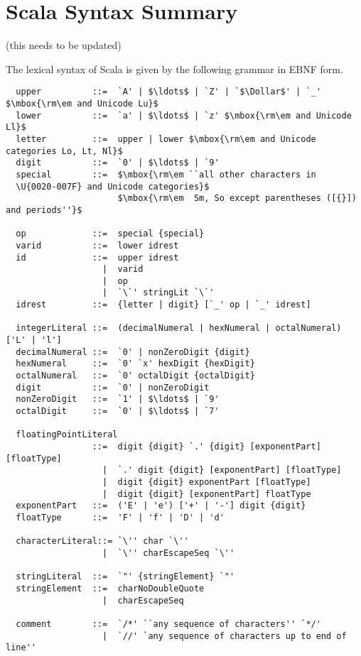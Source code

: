 \appendix
\chapter{Scala Syntax Summary}

(this needs to be updated)

The lexical syntax of Scala is given by the following grammar in EBNF
form.

\begin{lstlisting}
  upper          ::=  `A' | $\ldots$ | `Z' | `$\Dollar$' | `_' $\mbox{\rm\em and Unicode Lu}$
  lower          ::=  `a' | $\ldots$ | `z' $\mbox{\rm\em and Unicode Ll}$
  letter         ::=  upper | lower $\mbox{\rm\em and Unicode categories Lo, Lt, Nl}$
  digit          ::=  `0' | $\ldots$ | `9'
  special        ::=  $\mbox{\rm\em ``all other characters in
  \U{0020-007F} and Unicode categories}$
                      $\mbox{\rm\em  Sm, So except parentheses ([{}]) and periods''}$

  op             ::=  special {special} 
  varid          ::=  lower idrest
  id             ::=  upper idrest
                   |  varid
                   |  op
                   |  `\`' stringLit `\`'
  idrest         ::=  {letter | digit} [`_' op | `_' idrest]

  integerLiteral ::=  (decimalNumeral | hexNumeral | octalNumeral) ['L' | 'l']
  decimalNumeral ::=  `0' | nonZeroDigit {digit}
  hexNumeral     ::=  `0' `x' hexDigit {hexDigit}
  octalNumeral   ::=  `0' octalDigit {octalDigit}
  digit          ::=  `0' | nonZeroDigit
  nonZeroDigit   ::=  `1' | $\ldots$ | `9'
  octalDigit     ::=  `0' | $\ldots$ | `7'

  floatingPointLiteral 
                 ::=  digit {digit} `.' {digit} [exponentPart] [floatType]
                   |  `.' digit {digit} [exponentPart] [floatType]
                   |  digit {digit} exponentPart [floatType]
                   |  digit {digit} [exponentPart] floatType
  exponentPart   ::=  ('E' | 'e') ['+' | '-'] digit {digit}
  floatType      ::=  'F' | 'f' | 'D' | 'd'

  characterLiteral::= `\'' char `\''
                   |  `\'' charEscapeSeq `\''

  stringLiteral  ::=  `"' {stringElement} `"'
  stringElement  ::=  charNoDoubleQuote 
                   |  charEscapeSeq

  comment        ::=  `/*' ``any sequence of characters'' `*/'
                   |  `//' `any sequence of characters up to end of line''
\end{lstlisting}

